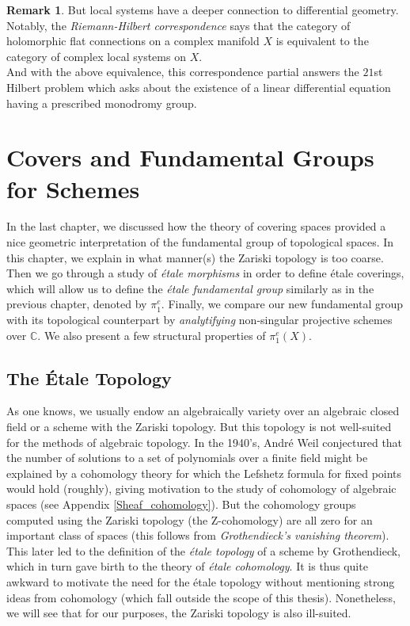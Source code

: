 \documentclass{article}
\theoremstyle{plain}
\theoremstyle{definition}
\newtheorem{remark}{Remark}
\begin{document}
\begin{remark}
    But local systems have a deeper connection to differential geometry. Notably, the \textit{Riemann-Hilbert correspondence} says that the category of holomorphic flat connections on a complex manifold $X$ is equivalent to the category of complex local systems on $X$.\\
    And with the above equivalence, this correspondence partial answers the $21$st Hilbert problem which asks about the existence of a linear differential equation having a prescribed monodromy group.
\end{remark}








\newpage
\section{Covers and Fundamental Groups for Schemes}

In the last chapter, we discussed how the theory of covering spaces provided a nice geometric interpretation of the fundamental group of topological spaces.
In this chapter, we explain in what manner(s) the Zariski topology is too coarse. 
Then we go through a study of \textit{\'etale morphisms} in order to define \'etale coverings,
which will allow us to define the \textit{\'etale fundamental group} similarly as in the previous chapter, denoted by $\pi_1^e$. 
Finally, we compare our new fundamental group with its topological counterpart by \textit{analytifying} non-singular projective schemes over $\mathbb{C}$. 
We also present a few structural properties of $\pi_1^e(X)$.\\





\subsection{The \'Etale Topology}
\label{nex_topology}


As one knows, we usually endow an algebraically variety over an algebraic closed field or a scheme with the Zariski topology. 
But this topology is not well-suited for the methods of algebraic topology. 
In the 1940's, Andr\'e Weil conjectured  that the number of solutions to a set of polynomials over a finite field might be explained by a cohomology theory for which the Lefshetz formula for fixed points would hold (roughly), giving motivation to the study of cohomology of algebraic spaces (see Appendix \ref{Sheaf_cohomology}).
But the cohomology groups computed using the Zariski topology (the Z-cohomology) are all zero for an important class of spaces (this follows from \textit{Grothendieck's vanishing theorem}).
This later led to the definition of the \textit{\'etale topology} of a scheme by Grothendieck, which in turn gave birth to the theory of \textit{\'etale cohomology}. 
It is thus quite awkward to motivate the need for the \'etale topology without mentioning strong ideas from cohomology 
(which fall outside the scope of this thesis).
Nonetheless, we will see that for our purposes, the Zariski topology is also ill-suited. 
\end{document}
